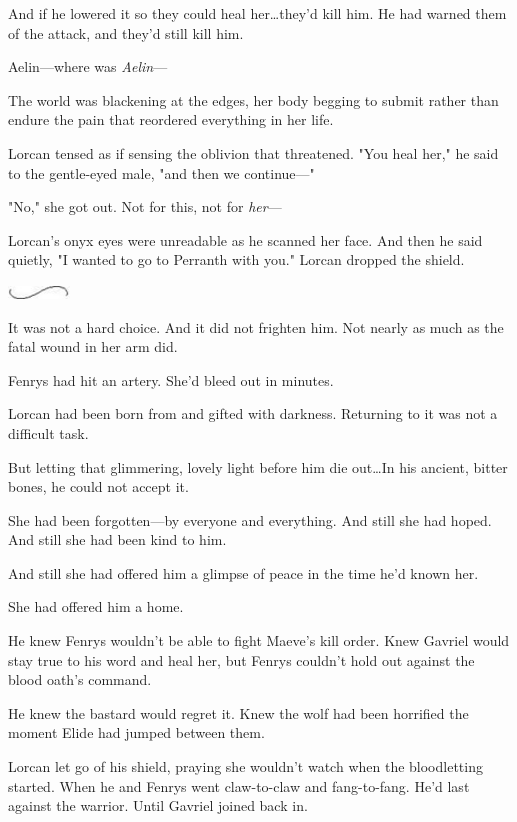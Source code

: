 And if he lowered it so they could heal her\ldots they'd kill him.
He had warned them of the attack, and they'd still kill him.

Aelin---where was \emph{Aelin}---

The world was blackening at the edges, her body begging to submit rather than endure the pain that reordered everything in her life.

Lorcan tensed as if sensing the oblivion that threatened.
"You heal her," he said to the gentle-eyed male, "and then we continue---"

"No," she got out.
Not for this, not for \emph{her}---

Lorcan's onyx eyes were unreadable as he scanned her face.
And then he said quietly, "I wanted to go to Perranth with you."
Lorcan dropped the shield.

\begin{center}
	\includegraphics[width=0.65in,height=0.13in]{images/seperator}
\end{center}

It was not a hard choice.
And it did not frighten him.
Not nearly as much as the fatal wound in her arm did.

Fenrys had hit an artery.
She'd bleed out in minutes.

Lorcan had been born from and gifted with darkness.
Returning to it was not a difficult task.

But letting that glimmering, lovely light before him die out\ldots In his ancient, bitter bones, he could not accept it.

She had been forgotten---by everyone and everything.
And still she had hoped.
And still she had been kind to him.

And still she had offered him a glimpse of peace in the time he'd known her.

She had offered him a home.

He knew Fenrys wouldn't be able to fight Maeve's kill order.
Knew Gavriel would stay true to his word and heal her, but Fenrys couldn't hold out against the blood oath's command.

He knew the bastard would regret it.
Knew the wolf had been horrified the moment Elide had jumped between them.

Lorcan let go of his shield, praying she wouldn't watch when the bloodletting started.
When he and Fenrys went claw-to-claw and fang-to-fang.
He'd last against the warrior.
Until Gavriel joined back in.

